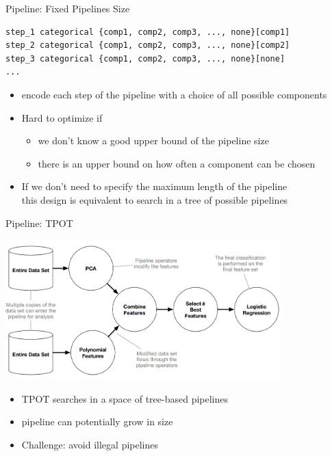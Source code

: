 \begin{frame}[c, fragile]{Pipeline: Fixed Pipelines Size}


\begin{verbatim}
step_1 categorical {comp1, comp2, comp3, ..., none}[comp1]
step_2 categorical {comp1, comp2, comp3, ..., none}[comp2]
step_3 categorical {comp1, comp2, comp3, ..., none}[none]
...
\end{verbatim}

\begin{itemize}
	\item encode each step of the pipeline with a choice of all possible components
	\item Hard to optimize if
	\begin{itemize}
		\item we don't know a good upper bound of the pipeline size
		\item there is an upper bound on how often a component can be chosen
	\end{itemize}
    \pause
    \bigskip
	\item If we don't need to specify the maximum length of the pipeline\\ this design is equivalent to search in a tree of possible pipelines
\end{itemize}

\end{frame}
\begin{frame}[c]{Pipeline: TPOT }

\centering
\includegraphics[width=0.8\textwidth]{images/tpot_tree}

\begin{itemize}
  \item TPOT searches in a space of tree-based pipelines
  \item pipeline can potentially grow in size
  \item Challenge: avoid illegal pipelines
\end{itemize}

\end{frame}
